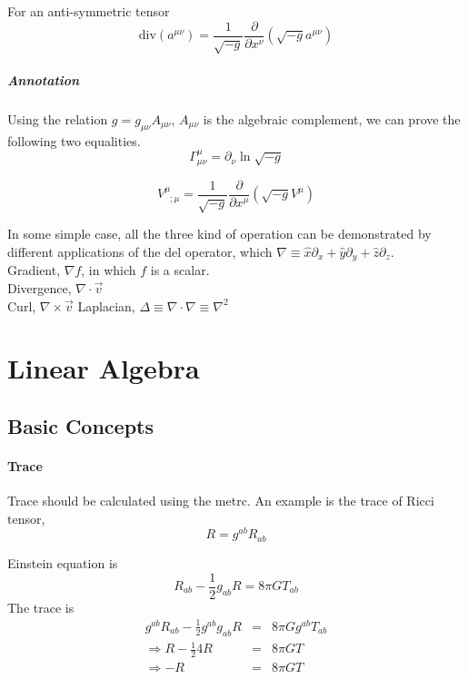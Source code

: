 For an anti-symmetric tensor
\begin{equation}
\mathrm {div}(a^{\mu\nu})=\frac1{\sqrt{-g}}\frac{\partial}{\partial x^\nu}(\sqrt{-g}a^{\mu\nu})
\end{equation}

\subparagraph{Annotation} Using the relation $g=g_{\mu\nu}A_{\mu\nu}$, $A_{\mu\nu}$ is the algebraic complement, we can prove the following two equalities.
\begin{equation}
\Gamma^\mu_{\mu\nu}=\partial_\nu\ln{\sqrt{-g}}
\end{equation}

\begin{equation}
V^\mu_{\phantom\mu;\mu}=\frac1{\sqrt{-g}}\frac{\partial}{\partial x^\mu}(\sqrt{-g}V^\mu)
\end{equation}

In some simple case, all the three kind of operation can be demonstrated by different applications of the del operator, which $\nabla\equiv \hat x\partial_x+\hat y\partial_y+\hat z \partial_z$. \\
Gradient,  $\nabla f$, in which $f$ is a scalar. \\
Divergence, $\nabla\cdot \vec v$ \\
Curl, $\nabla \times \vec v$
Laplacian, $\Delta\equiv \nabla\cdot\nabla\equiv \nabla^2$


\section{Linear Algebra}

\subsection{Basic Concepts}

\paragraph{Trace}
Trace should be calculated using the metrc. An example is the trace of Ricci tensor,
\begin{equation}
R=g^{ab}R_{ab}
\end{equation}

Einstein equation is \begin{equation}
R_{ab}-\frac{1}{2}g_{ab}R=8\pi G T_{ab}
\end{equation}
 The trace is \begin{eqnarray}
g^{ab}R_{ab}-\frac{1}{2}g^{ab}g_{ab}R&=&8\pi G g^{ab}T_{ab} \\
\Rightarrow R-\frac{1}{2} 4 R &=& 8\pi G T \\
\Rightarrow -R&=&8\pi GT
\end{eqnarray}







